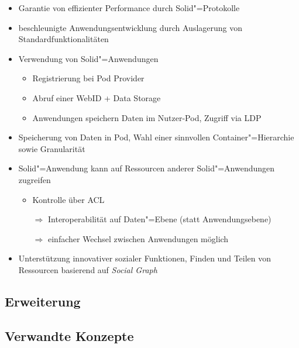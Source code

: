 \begin{itemize}
    \item Garantie von effizienter Performance durch Solid"=Protokolle~\cite{sambraSolidPlatformDecentralized2016}
    \item beschleunigte Anwendungsentwicklung durch Auslagerung von Standardfunktionalitäten~\cite{sambraSolidPlatformDecentralized2016}
    
    \item Verwendung von Solid"=Anwendungen~\cite{sambraSolidPlatformDecentralized2016}
    \begin{itemize}
        \item Registrierung bei Pod Provider
        \item Abruf einer WebID + Data Storage
        \item Anwendungen speichern Daten im Nutzer-Pod, Zugriff via LDP
    \end{itemize}

    \item Speicherung von Daten in Pod, Wahl einer sinnvollen Container"=Hierarchie sowie Granularität~\cite{sambraSolidPlatformDecentralized2016}

    \item Solid"=Anwendung kann auf Ressourcen anderer Solid"=Anwendungen zugreifen~\cite{sambraSolidPlatformDecentralized2016}
    \begin{itemize}
        \item Kontrolle über ACL~\cite{sambraSolidPlatformDecentralized2016}
        \item[$\Rightarrow$] Interoperabilität auf Daten"=Ebene (statt Anwendungsebene)~\cite{sambraSolidPlatformDecentralized2016}
        \item[$\Rightarrow$] einfacher Wechsel zwischen Anwendungen möglich~\cite{sambraSolidPlatformDecentralized2016}
    \end{itemize}

    \item Unterstützung innovativer sozialer Funktionen, Finden und Teilen von Ressourcen basierend auf \emph{Social Graph}~\cite{sambraSolidPlatformDecentralized2016}
\end{itemize}


\subsection{Erweiterung}

\cite{bothSolidBasedB2BData2025}

\subsection{Verwandte Konzepte}
